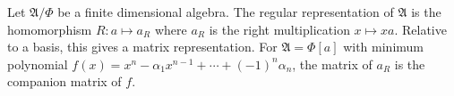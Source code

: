 Let $\mathfrak{A}/\Phi$ be a finite dimensional algebra. The regular representation of $\mathfrak{A}$ is the homomorphism $R: a \mapsto a_R$ where $a_R$ is the right multiplication $x \mapsto xa$. Relative to a basis, this gives a matrix representation. For $\mathfrak{A} = \Phi[a]$ with minimum polynomial $f(x) = x^n - \alpha_1 x^{n-1} + \cdots + (-1)^n \alpha_n$, the matrix of $a_R$ is the companion matrix of $f$.
